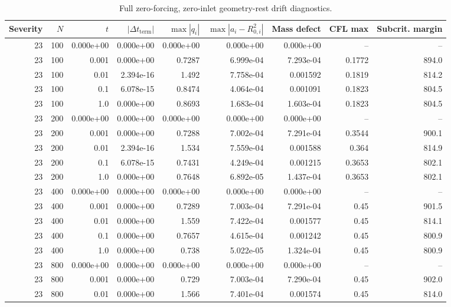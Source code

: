 \begin{table}[!htb]
    \centering
    \scriptsize
    \caption{Full zero-forcing, zero-inlet geometry-rest drift diagnostics.}
    \begin{tabular}{@{}rrrrrrrrr@{}}
        \toprule
        Severity & $N$ & $t$ & $|\Delta t_{\mathrm{term}}|$ & $\max |q_i|$ & $\max |a_i-R_{0,i}^2|$ & Mass defect & CFL max & Subcrit. margin \\
        \midrule
23 & 100 & 0.000e+00 & 0.000e+00 & 0.000e+00 & 0.000e+00 & 0.000e+00 & -- & -- \\
23 & 100 & 0.001 & 0.000e+00 & 0.7287 & 6.999e-04 & 7.293e-04 & 0.1772 & 894.0 \\
23 & 100 & 0.01 & 2.394e-16 & 1.492 & 7.758e-04 & 0.001592 & 0.1819 & 814.2 \\
23 & 100 & 0.1 & 6.078e-15 & 0.8474 & 4.064e-04 & 0.001091 & 0.1823 & 804.5 \\
23 & 100 & 1.0 & 0.000e+00 & 0.8693 & 1.683e-04 & 1.603e-04 & 0.1823 & 804.5 \\
23 & 200 & 0.000e+00 & 0.000e+00 & 0.000e+00 & 0.000e+00 & 0.000e+00 & -- & -- \\
23 & 200 & 0.001 & 0.000e+00 & 0.7288 & 7.002e-04 & 7.291e-04 & 0.3544 & 900.1 \\
23 & 200 & 0.01 & 2.394e-16 & 1.534 & 7.559e-04 & 0.001588 & 0.364 & 814.9 \\
23 & 200 & 0.1 & 6.078e-15 & 0.7431 & 4.249e-04 & 0.001215 & 0.3653 & 802.1 \\
23 & 200 & 1.0 & 0.000e+00 & 0.7648 & 6.892e-05 & 1.437e-04 & 0.3653 & 802.1 \\
23 & 400 & 0.000e+00 & 0.000e+00 & 0.000e+00 & 0.000e+00 & 0.000e+00 & -- & -- \\
23 & 400 & 0.001 & 0.000e+00 & 0.7289 & 7.003e-04 & 7.291e-04 & 0.45 & 901.5 \\
23 & 400 & 0.01 & 0.000e+00 & 1.559 & 7.422e-04 & 0.001577 & 0.45 & 814.1 \\
23 & 400 & 0.1 & 0.000e+00 & 0.7657 & 4.615e-04 & 0.001242 & 0.45 & 800.9 \\
23 & 400 & 1.0 & 0.000e+00 & 0.738 & 5.022e-05 & 1.324e-04 & 0.45 & 800.9 \\
23 & 800 & 0.000e+00 & 0.000e+00 & 0.000e+00 & 0.000e+00 & 0.000e+00 & -- & -- \\
23 & 800 & 0.001 & 0.000e+00 & 0.729 & 7.003e-04 & 7.290e-04 & 0.45 & 902.0 \\
23 & 800 & 0.01 & 0.000e+00 & 1.566 & 7.401e-04 & 0.001574 & 0.45 & 814.0 \\

\end{tabular}
\end{table}
